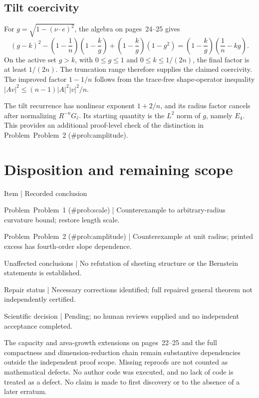 \documentclass[10pt]{article}
\begin{document}
\subsection*{Tilt coercivity}
For \(g=\sqrt{1-(\nu\cdot e)^2}\), the algebra on pages 24–25 gives \[(g-k)^2-\left(1-\frac1n\right)\left(1-\frac{k}{g}\right)
 +\left(1-\frac{k}{g}\right)(1-g^2)
 =\left(1-\frac{k}{g}\right)\left(\frac1n-kg\right).\] On the active set \(g>k\), with \(0\le g\le1\) and \(0\le k\le1/(2n)\), the final factor is at least \(1/(2n)\). The truncation range therefore supplies the claimed coercivity. The improved factor \(1-1/n\) follows from the trace-free shape-operator inequality \(|Av|^2\le(n-1)|A|^2|v|^2/n\).\par
The tilt recurrence has nonlinear exponent \(1+2/n\), and its radius factor cancels after normalizing \(R^{-n}G_\ell\). Its starting quantity is the \(L^2\) norm of \(g\), namely \(E_4\). This provides an additional proof-level check of the distinction in Problem Problem 2 (\#prob:amplitude).\par
\section*{Disposition and remaining scope}
Item | Recorded conclusion\par
Problem Problem 1 (\#prob:scale) | Counterexample to arbitrary-radius curvature bound; restore length scale.\par
Problem Problem 2 (\#prob:amplitude) | Counterexample at unit radius; printed excess has fourth-order slope dependence.\par
Unaffected conclusions | No refutation of sheeting structure or the Bernstein statements is established.\par
Repair status | Necessary corrections identified; full repaired general theorem not independently certified.\par
Scientific decision | Pending; no human reviews supplied and no independent acceptance completed.\par
The capacity and area-growth extensions on pages 22–25 and the full compactness and dimension-reduction chain remain substantive dependencies outside the independent proof scope. Missing reproofs are not counted as mathematical defects. No author code was executed, and no lack of code is treated as a defect. No claim is made to first discovery or to the absence of a later erratum.\par
\end{document}
